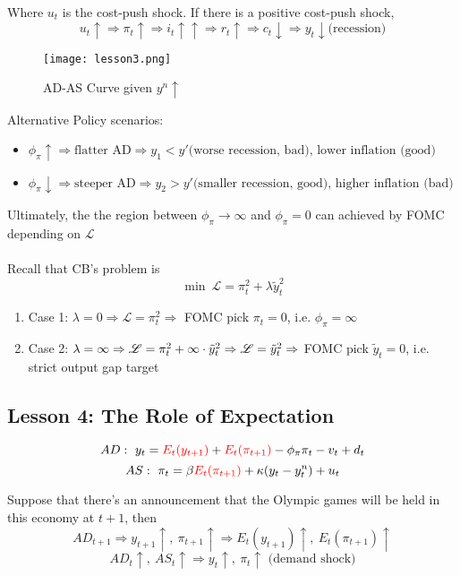 \documentclass{article}
\begin{document}
\noindent Where $u_t$ is the cost-push shock. If there is a positive cost-push shock,
$$u_t \uparrow \Rightarrow \pi_t \uparrow \Rightarrow i_t \uparrow\uparrow \Rightarrow r_t\uparrow \Rightarrow c_t \downarrow \Rightarrow y_t \downarrow \text{(recession)}$$

\begin{figure}[h!]
    \centering
    \texttt{[image: lesson3.png]}
    \caption{AD-AS Curve given $y^n\uparrow$}
    \label{fig:enter-label}
\end{figure}

\noindent Alternative Policy scenarios:
\begin{itemize}
    \item $\phi_\pi \uparrow \Rightarrow \text{flatter AD}\Rightarrow y_1 < y' \text{(worse recession, bad), lower inflation (good)}$
    
    \item $\phi_\pi \downarrow \Rightarrow \text{steeper AD}\Rightarrow y_2 > y' \text{(smaller recession, good), higher inflation (bad)}$
\end{itemize}

\noindent Ultimately, the the region between $\phi_\pi \rightarrow \infty$ and $\phi_\pi = 0$ can achieved by FOMC depending on $\mathscr{L}$\\
\\
Recall that CB's problem is 
$$\min\ \mathscr{L} = \pi_t^2 + \lambda \tilde{y}_t^2$$

\begin{enumerate}
    \item Case 1: $\lambda = 0 \Rightarrow \mathscr{L} = \pi_t^2 \Rightarrow$ FOMC pick $\pi_t = 0$, i.e. $\phi_\pi = \infty$
    \item Case 2: $\lambda = \infty \Rightarrow \mathscr{L} = \pi_t^2 + \infty \cdot \Tilde{y}_t^2 \Rightarrow \mathscr{L} = \tilde{y}_t^2 \Rightarrow$ FOMC pick $\tilde{y}_t = 0$, i.e. strict output gap target
\end{enumerate}


\subsection{Lesson 4: The Role of Expectation}

$$AD:\ y_t = {\color{red}E_t(y_{t+1})} + {\color{red}E_t (\pi_{t+1})} - \phi_\pi \pi_t - v_t + d_t$$
$$AS:\ \pi_t = \beta {\color{red}E_t(\pi_{t+1})} + \kappa (y_t - y_t^n) + u_t$$

Suppose that there's an announcement that the Olympic games will be held in this economy at $t+1$, then
$$AD_{t+1} \Rightarrow y_{t+1}\uparrow,\ \pi_{t+1}\uparrow \Rightarrow E_t(y_{t+1})\uparrow,\ E_t(\pi_{t+1})\uparrow$$
$$AD_t\uparrow,\ AS_t\uparrow \Rightarrow y_t \uparrow,\ \pi_t\uparrow \text{ (demand shock)}$$
\end{document}
